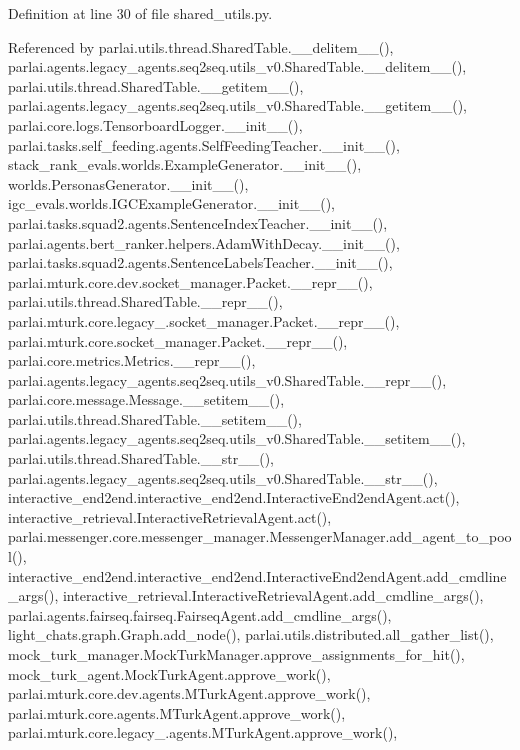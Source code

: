 Definition at line 30 of file shared\+\_\+utils.\+py.



Referenced by parlai.\+utils.\+thread.\+Shared\+Table.\+\_\+\+\_\+delitem\+\_\+\+\_\+(), parlai.\+agents.\+legacy\+\_\+agents.\+seq2seq.\+utils\+\_\+v0.\+Shared\+Table.\+\_\+\+\_\+delitem\+\_\+\+\_\+(), parlai.\+utils.\+thread.\+Shared\+Table.\+\_\+\+\_\+getitem\+\_\+\+\_\+(), parlai.\+agents.\+legacy\+\_\+agents.\+seq2seq.\+utils\+\_\+v0.\+Shared\+Table.\+\_\+\+\_\+getitem\+\_\+\+\_\+(), parlai.\+core.\+logs.\+Tensorboard\+Logger.\+\_\+\+\_\+init\+\_\+\+\_\+(), parlai.\+tasks.\+self\+\_\+feeding.\+agents.\+Self\+Feeding\+Teacher.\+\_\+\+\_\+init\+\_\+\+\_\+(), stack\+\_\+rank\+\_\+evals.\+worlds.\+Example\+Generator.\+\_\+\+\_\+init\+\_\+\+\_\+(), worlds.\+Personas\+Generator.\+\_\+\+\_\+init\+\_\+\+\_\+(), igc\+\_\+evals.\+worlds.\+I\+G\+C\+Example\+Generator.\+\_\+\+\_\+init\+\_\+\+\_\+(), parlai.\+tasks.\+squad2.\+agents.\+Sentence\+Index\+Teacher.\+\_\+\+\_\+init\+\_\+\+\_\+(), parlai.\+agents.\+bert\+\_\+ranker.\+helpers.\+Adam\+With\+Decay.\+\_\+\+\_\+init\+\_\+\+\_\+(), parlai.\+tasks.\+squad2.\+agents.\+Sentence\+Labels\+Teacher.\+\_\+\+\_\+init\+\_\+\+\_\+(), parlai.\+mturk.\+core.\+dev.\+socket\+\_\+manager.\+Packet.\+\_\+\+\_\+repr\+\_\+\+\_\+(), parlai.\+utils.\+thread.\+Shared\+Table.\+\_\+\+\_\+repr\+\_\+\+\_\+(), parlai.\+mturk.\+core.\+legacy\+\_.\+socket\+\_\+manager.\+Packet.\+\_\+\+\_\+repr\+\_\+\+\_\+(), parlai.\+mturk.\+core.\+socket\+\_\+manager.\+Packet.\+\_\+\+\_\+repr\+\_\+\+\_\+(), parlai.\+core.\+metrics.\+Metrics.\+\_\+\+\_\+repr\+\_\+\+\_\+(), parlai.\+agents.\+legacy\+\_\+agents.\+seq2seq.\+utils\+\_\+v0.\+Shared\+Table.\+\_\+\+\_\+repr\+\_\+\+\_\+(), parlai.\+core.\+message.\+Message.\+\_\+\+\_\+setitem\+\_\+\+\_\+(), parlai.\+utils.\+thread.\+Shared\+Table.\+\_\+\+\_\+setitem\+\_\+\+\_\+(), parlai.\+agents.\+legacy\+\_\+agents.\+seq2seq.\+utils\+\_\+v0.\+Shared\+Table.\+\_\+\+\_\+setitem\+\_\+\+\_\+(), parlai.\+utils.\+thread.\+Shared\+Table.\+\_\+\+\_\+str\+\_\+\+\_\+(), parlai.\+agents.\+legacy\+\_\+agents.\+seq2seq.\+utils\+\_\+v0.\+Shared\+Table.\+\_\+\+\_\+str\+\_\+\+\_\+(), interactive\+\_\+end2end.\+interactive\+\_\+end2end.\+Interactive\+End2end\+Agent.\+act(), interactive\+\_\+retrieval.\+Interactive\+Retrieval\+Agent.\+act(), parlai.\+messenger.\+core.\+messenger\+\_\+manager.\+Messenger\+Manager.\+add\+\_\+agent\+\_\+to\+\_\+pool(), interactive\+\_\+end2end.\+interactive\+\_\+end2end.\+Interactive\+End2end\+Agent.\+add\+\_\+cmdline\+\_\+args(), interactive\+\_\+retrieval.\+Interactive\+Retrieval\+Agent.\+add\+\_\+cmdline\+\_\+args(), parlai.\+agents.\+fairseq.\+fairseq.\+Fairseq\+Agent.\+add\+\_\+cmdline\+\_\+args(), light\+\_\+chats.\+graph.\+Graph.\+add\+\_\+node(), parlai.\+utils.\+distributed.\+all\+\_\+gather\+\_\+list(), mock\+\_\+turk\+\_\+manager.\+Mock\+Turk\+Manager.\+approve\+\_\+assignments\+\_\+for\+\_\+hit(), mock\+\_\+turk\+\_\+agent.\+Mock\+Turk\+Agent.\+approve\+\_\+work(), parlai.\+mturk.\+core.\+dev.\+agents.\+M\+Turk\+Agent.\+approve\+\_\+work(), parlai.\+mturk.\+core.\+agents.\+M\+Turk\+Agent.\+approve\+\_\+work(), parlai.\+mturk.\+core.\+legacy\+\_.\+agents.\+M\+Turk\+Agent.\+approve\+\_\+work(), 